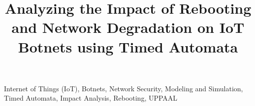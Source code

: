 \documentclass[conference]{IEEEtran}
\begin{document}






\title{Analyzing the Impact of Rebooting and Network Degradation on IoT Botnets using Timed Automata}


\author{
}



\maketitle



\begin{abstract}
\fontsize{10pt}{12pt}\selectfont
\label{abstract}

\end{abstract}


\begin{IEEEkeywords}
\fontsize{10pt}{12pt}\selectfont
Internet of Things (IoT), Botnets, Network Security, Modeling and Simulation, Timed Automata, Impact Analysis, Rebooting, UPPAAL
\end{IEEEkeywords}
\end{document}
